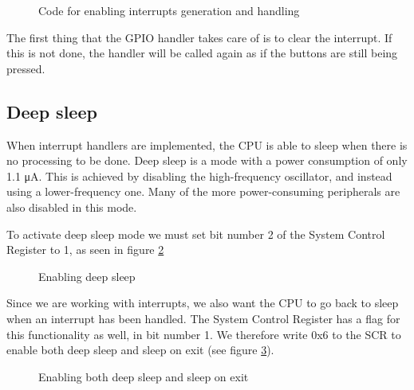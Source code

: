 \begin{figure}[h!]
\caption{Code for enabling interrupts generation and handling}
\label{code:interrupt_setup}
\end{figure}


The first thing that the GPIO handler takes care of is to clear the interrupt. If this is not done, the handler will be called again as if the buttons are still being pressed.

\subsection{Deep sleep}
\label{subsec:dev_pros_deep_sleep}

When interrupt handlers are implemented, the CPU is able to sleep when there is no processing to be done.
Deep sleep is a mode with a power consumption of only 1.1 \si{\micro\ampere}.
This is achieved by disabling the high-frequency oscillator, and instead using a lower-frequency one.
Many of the more power-consuming peripherals are also disabled in this mode.

To activate deep sleep mode we must set bit number 2 of the System Control Register to 1, as seen in figure \ref{code:deep_sleep}

\begin{figure}[h!]
\caption{Enabling deep sleep}
\label{code:deep_sleep}
\end{figure}

Since we are working with interrupts, we also want the CPU to go back to sleep when an interrupt has been handled.
The System Control Register has a flag for this functionality as well, in bit number 1.
We therefore write 0x6 to the SCR to enable both deep sleep and sleep on exit (see figure \ref{code:deep_sleep_on_exit}).

\begin{figure}[h!]
\caption{Enabling both deep sleep and sleep on exit}
\label{code:deep_sleep_on_exit}
\end{figure}

